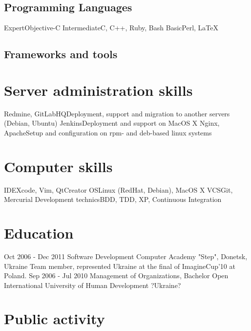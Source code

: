 \documentclass[11pt,a4paper]{moderncv}
\begin{document}
\subsection{Programming Languages}
\cvline
  {Expert}{Objective-C}
\cvline
  {Intermediate}{C, C++, Ruby, Bash}
\cvline
  {Basic}{Perl, LaTeX}
\subsection{Frameworks and tools}

\section{Server administration skills}
\cvline
  {Redmine, GitLabHQ}{Deployment, support and migration to another servers (Debian, Ubuntu)}
\cvline
  {Jenkins}{Deployment and support on MacOS X}
\cvline
  {Nginx, Apache}{Setup and configuration on rpm- and deb-based linux systems}

\section{Computer skills}
  \cvline
  {IDE}{Xcode, Vim, QtCreator}
  \cvline
  {OS}{Linux (RedHat, Debian), MacOS X}
  \cvline
  {VCS}{Git, Mercurial}
  \cvline
  {Development technics}{BDD, TDD, XP, Continuous Integration}

\section{Education}
  \cventry
    {Oct 2006 - Dec 2011}
    {Software Development}
    {Computer Academy "Step", Donetsk, Ukraine}
    {}{}
    {Team member, represented Ukraine at the final of ImagineCup'10 at Poland.}
  \cventry
    {Sep 2006 - Jul 2010}
    {Management of Organizations, Bachelor}
    {Open International University of Human Development ?Ukraine?}
    {}{}{}

\section{Public activity}
\end{document}

